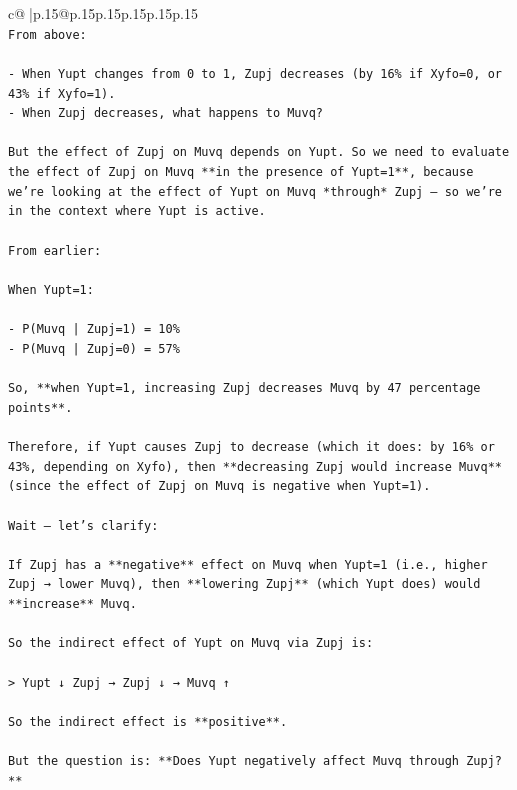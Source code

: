 \documentclass{article}
\begin{document}
{\begin{supertabular}{c@{$\;$}|p{.15\linewidth}@{}p{.15\linewidth}p{.15\linewidth}p{.15\linewidth}p{.15\linewidth}p{.15\linewidth}}
{{{\\ 
\texttt{From above:} \\
\\ 
\texttt{{-} When Yupt changes from 0 to 1, Zupj decreases (by 16\% if Xyfo=0, or 43\% if Xyfo=1).} \\
\texttt{{-} When Zupj decreases, what happens to Muvq?} \\
\\ 
\texttt{But the effect of Zupj on Muvq depends on Yupt. So we need to evaluate the effect of Zupj on Muvq **in the presence of Yupt=1**, because we’re looking at the effect of Yupt on Muvq *through* Zupj — so we’re in the context where Yupt is active.} \\
\\ 
\texttt{From earlier:} \\
\\ 
\texttt{When Yupt=1:} \\
\\ 
\texttt{{-} P(Muvq | Zupj=1) = 10\%} \\
\texttt{{-} P(Muvq | Zupj=0) = 57\%} \\
\\ 
\texttt{So, **when Yupt=1, increasing Zupj decreases Muvq by 47 percentage points**.} \\
\\ 
\texttt{Therefore, if Yupt causes Zupj to decrease (which it does: by 16\% or 43\%, depending on Xyfo), then **decreasing Zupj would increase Muvq** (since the effect of Zupj on Muvq is negative when Yupt=1).} \\
\\ 
\texttt{Wait — let’s clarify:} \\
\\ 
\texttt{If Zupj has a **negative** effect on Muvq when Yupt=1 (i.e., higher Zupj → lower Muvq), then **lowering Zupj** (which Yupt does) would **increase** Muvq.} \\
\\ 
\texttt{So the indirect effect of Yupt on Muvq via Zupj is:} \\
\\ 
\texttt{> Yupt ↓ Zupj → Zupj ↓ → Muvq ↑} \\
\\ 
\texttt{So the indirect effect is **positive**.} \\
\\ 
\texttt{But the question is: **Does Yupt negatively affect Muvq through Zupj?**} \\
\\ 
}}}
\end{supertabular}}
\end{document}
